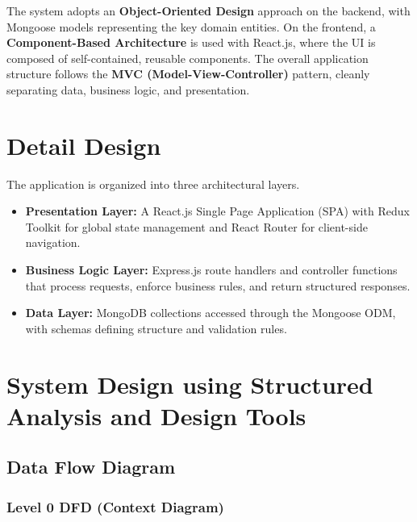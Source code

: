 \documentclass[12pt, a4paper, oneside]{report}
\begin{document}
The system adopts an \textbf{Object-Oriented Design} approach on the backend, with Mongoose models representing the key domain entities. On the frontend, a \textbf{Component-Based Architecture} is used with React.js, where the UI is composed of self-contained, reusable components. The overall application structure follows the \textbf{MVC (Model-View-Controller)} pattern, cleanly separating data, business logic, and presentation.

\section{Detail Design}

The application is organized into three architectural layers.

\begin{itemize}[leftmargin=1.5cm, itemsep=2pt]
  \item \textbf{Presentation Layer:} A React.js Single Page Application (SPA) with Redux Toolkit for global state management and React Router for client-side navigation.
  \item \textbf{Business Logic Layer:} Express.js route handlers and controller functions that process requests, enforce business rules, and return structured responses.
  \item \textbf{Data Layer:} MongoDB collections accessed through the Mongoose ODM, with schemas defining structure and validation rules.
\end{itemize}

\section{System Design using Structured Analysis and Design Tools}

\subsection{Data Flow Diagram}

\subsubsection{Level 0 DFD (Context Diagram)}
\end{document}
